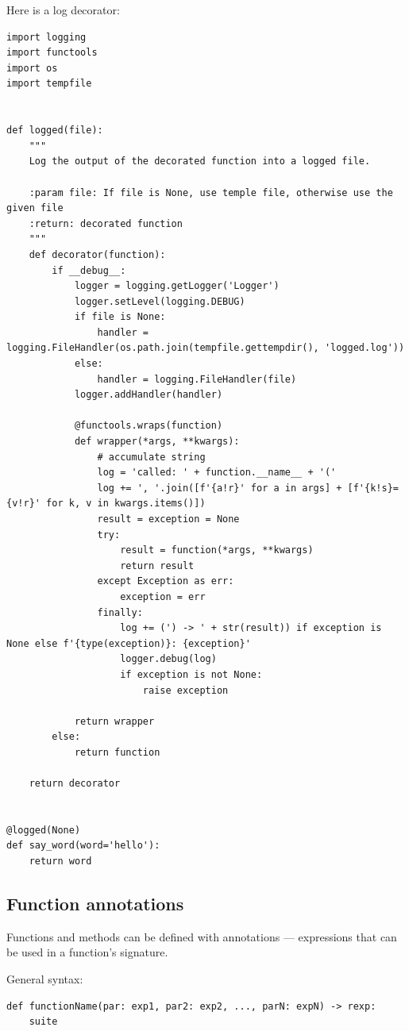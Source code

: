 Here is a log decorator:
\begin{lstlisting}
import logging
import functools
import os
import tempfile


def logged(file):
    """
    Log the output of the decorated function into a logged file.

    :param file: If file is None, use temple file, otherwise use the given file
    :return: decorated function
    """
    def decorator(function):
        if __debug__:
            logger = logging.getLogger('Logger')
            logger.setLevel(logging.DEBUG)
            if file is None:
                handler = logging.FileHandler(os.path.join(tempfile.gettempdir(), 'logged.log'))
            else:
                handler = logging.FileHandler(file)
            logger.addHandler(handler)

            @functools.wraps(function)
            def wrapper(*args, **kwargs):
                # accumulate string
                log = 'called: ' + function.__name__ + '('
                log += ', '.join([f'{a!r}' for a in args] + [f'{k!s}={v!r}' for k, v in kwargs.items()])
                result = exception = None
                try:
                    result = function(*args, **kwargs)
                    return result
                except Exception as err:
                    exception = err
                finally:
                    log += (') -> ' + str(result)) if exception is None else f'{type(exception)}: {exception}'
                    logger.debug(log)
                    if exception is not None:
                        raise exception

            return wrapper
        else:
            return function

    return decorator


@logged(None)
def say_word(word='hello'):
    return word  
\end{lstlisting}

\subsection{Function annotations}

Functions and methods can be defined with annotations --- expressions that can be used in a function's signature.

\begin{tcolorbox}
  General syntax:
\begin{verbatim}
def functionName(par: exp1, par2: exp2, ..., parN: expN) -> rexp:
    suite
\end{verbatim}
\end{tcolorbox}

